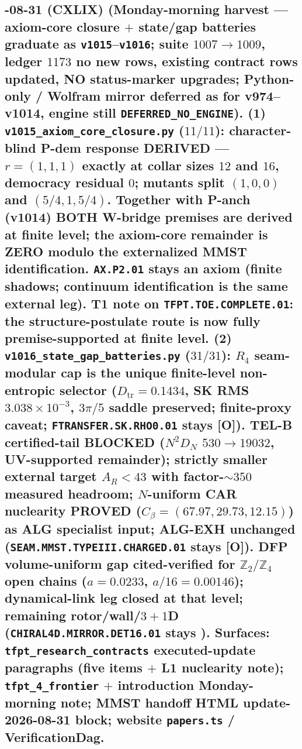 \documentclass[11pt]{article}
\providecommand{\mO}{\textbf{[O]}}\providecommand{\mX}{\textbf{[X]}}
\begin{document}
\subsection*{-08-31 (CXLIX) (Monday-morning harvest --- axiom-core closure $+$ state/gap batteries graduate as \texttt{v1015}--\texttt{v1016}; suite $1007 \to 1009$, ledger $1173$ no new rows, existing contract rows updated, NO status-marker upgrades; Python-only / Wolfram mirror deferred as for v974--v1014, engine still \texttt{DEFERRED\_NO\_ENGINE}).  \textbf{(1)} \texttt{v1015\_\allowbreak axiom\_\allowbreak core\_\allowbreak closure.py} ($11/11$): character-blind P-dem response DERIVED --- $r=(1,1,1)$ exactly at collar sizes $12$ and $16$, democracy residual $0$; mutants split $(1,0,0)$ and $(5/4,1,5/4)$.  Together with P-anch (v1014) BOTH W-bridge premises are derived at finite level; the axiom-core remainder is ZERO modulo the externalized MMST identification.  \texttt{AX.P2.01} stays an axiom (finite shadows; continuum identification is the same external leg).  T1 note on \texttt{TFPT.TOE.COMPLETE.01}: the structure-postulate route is now fully premise-supported at finite level.  \textbf{(2)} \texttt{v1016\_\allowbreak state\_\allowbreak gap\_\allowbreak batteries.py} ($31/31$): $R_4$ seam-modular cap is the unique finite-level non-entropic selector ($D_{\mathrm{tr}}=0.1434$, SK RMS $3.038{\times}10^{-3}$, $3\pi/5$ saddle preserved; finite-proxy caveat; \texttt{FTRANSFER.SK.RHO0.01} stays \mO).  TEL-B certified-tail BLOCKED ($N^2 D_N$ $530\to19032$, UV-supported remainder); strictly smaller external target $A_R<43$ with factor-$\sim350$ measured headroom; $N$-uniform CAR nuclearity PROVED ($C_\beta=(67.97,29.73,12.15)$) as ALG specialist input; ALG-EXH unchanged (\texttt{SEAM.MMST.TYPEIII.CHARGED.01} stays \mO).  DFP volume-uniform gap cited-verified for $\mathbb Z_2/\mathbb Z_4$ open chains ($a=0.0233$, $a/16=0.00146$); dynamical-link leg closed at that level; remaining rotor/wall/$3{+}1$D (\texttt{CHIRAL4D.MIRROR.DET16.01} stays \mC).  Surfaces: \texttt{tfpt\_research\_contracts} executed-update paragraphs (five items $+$ L1 nuclearity note); \texttt{tfpt\_4\_frontier} $+$ introduction Monday-morning note; MMST handoff HTML update-2026-08-31 block; website \texttt{papers.ts} / VerificationDag.}
\end{document}
